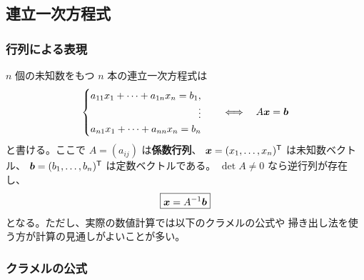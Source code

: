 \subsection{連立一次方程式}

\subsubsection{行列による表現}

$n$ 個の未知数をもつ $n$ 本の連立一次方程式は
\begin{equation}
 \begin{cases}
  a_{11}x_1+\cdots+a_{1n}x_n=b_1,\\
  \hfill\vdots\\
  a_{n1}x_1+\cdots+a_{nn}x_n=b_n
 \end{cases}
 \quad\Longleftrightarrow\quad
 A\vect{x}=\vect{b}
\end{equation}
と書ける。ここで $A=(a_{ij})$ は\textbf{係数行列}、
$\bm{x}=(x_1,\ldots,x_n)^{\mathsf T}$ は未知数ベクトル、
$\bm{b}=(b_1,\ldots,b_n)^{\mathsf T}$ は定数ベクトルである。
$\det A\ne0$ なら逆行列が存在し、
\begin{equation}
 \boxed{\bm{x}=A^{-1}\bm{b}}
\end{equation}
となる。ただし、実際の数値計算では以下のクラメルの公式や
掃き出し法を使う方が計算の見通しがよいことが多い。

\subsubsection{クラメルの公式}

